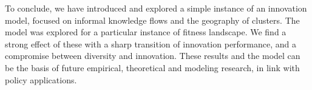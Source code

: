 \documentclass[letterpaper]{article}
\begin{document}
To conclude, we have introduced and explored a simple instance of an innovation model, focused on informal knowledge flows and the geography of clusters. The model was explored for a particular instance of fitness landscape. We find a strong effect of these with a sharp transition of innovation performance, and a compromise between diversity and innovation. These results and the model can be the basis of future empirical, theoretical and modeling research, in link with policy applications.






\footnotesize


\end{document}
